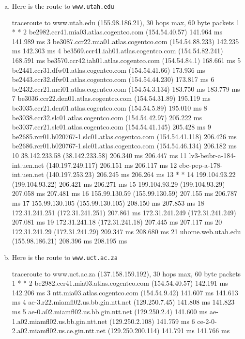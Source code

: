 \documentclass{article}
\begin{document}
\begin{enumerate}[a.]
\item Here is the route to {\tt www.utah.edu}
\begin{code}
traceroute to www.utah.edu (155.98.186.21), 30 hops max, 60 byte packets
 1  * *
 2  be2982.ccr41.mia03.atlas.cogentco.com (154.54.40.57)  141.964 ms  141.989 ms
 3  be3087.ccr22.mia01.atlas.cogentco.com (154.54.88.233)  142.235 ms  142.303 ms
 4  be3569.ccr41.iah01.atlas.cogentco.com (154.54.82.241)  168.591 ms be3570.ccr42.iah01.atlas.cogentco.com (154.54.84.1)  168.661 ms
 5  be2441.ccr31.dfw01.atlas.cogentco.com (154.54.41.66)  173.936 ms be2443.ccr32.dfw01.atlas.cogentco.com (154.54.44.230)  173.817 ms
 6  be2432.ccr21.mci01.atlas.cogentco.com (154.54.3.134)  183.750 ms  183.779 ms
 7  be3036.ccr22.den01.atlas.cogentco.com (154.54.31.89)  195.119 ms be3035.ccr21.den01.atlas.cogentco.com (154.54.5.89)  195.010 ms
 8  be3038.ccr32.slc01.atlas.cogentco.com (154.54.42.97)  205.222 ms be3037.ccr21.slc01.atlas.cogentco.com (154.54.41.145)  205.428 ms
 9  be2685.rcr01.b020767-1.slc01.atlas.cogentco.com (154.54.41.118)  206.426 ms be2686.rcr01.b020767-1.slc01.atlas.cogentco.com (154.54.46.134)  206.182 ms
10  38.142.233.58 (38.142.233.58)  206.340 ms  206.447 ms
11  lv3-beibr-a-184-int.uen.net (140.197.249.117)  206.151 ms  206.117 ms
12  ebc-pep-a-178-int.uen.net (140.197.253.23)  206.245 ms  206.264 ms
13  * *
14  199.104.93.22 (199.104.93.22)  206.421 ms  206.271 ms
15  199.104.93.29 (199.104.93.29)  207.058 ms  207.481 ms
16  155.99.130.59 (155.99.130.59)  207.155 ms  206.787 ms
17  155.99.130.105 (155.99.130.105)  208.150 ms  207.853 ms
18  172.31.241.251 (172.31.241.251)  207.861 ms 172.31.241.249 (172.31.241.249)  207.081 ms
19  172.31.241.18 (172.31.241.18)  207.445 ms  207.117 ms
20  172.31.241.29 (172.31.241.29)  209.347 ms  208.680 ms
21  uhome.web.utah.edu (155.98.186.21)  208.396 ms  208.195 ms
\end{code}
\item Here is the route to {\tt www.uct.ac.za}
\begin{code}
traceroute to www.uct.ac.za (137.158.159.192), 30 hops max, 60 byte packets
 1  * *
 2  be2982.ccr41.mia03.atlas.cogentco.com (154.54.40.57)  142.191 ms  142.206 ms
 3  ntt.mia03.atlas.cogentco.com (154.54.9.42)  141.607 ms  141.613 ms
 4  ae-3.r22.miamfl02.us.bb.gin.ntt.net (129.250.7.45)  141.808 ms  141.823 ms
 5  ae-0.a02.miamfl02.us.bb.gin.ntt.net (129.250.2.4)  141.600 ms ae-1.a02.miamfl02.us.bb.gin.ntt.net (129.250.2.108)  141.759 ms
 6  ce-2-0-2.a02.miamfl02.us.ce.gin.ntt.net (129.250.200.114)  141.791 ms  141.766 ms

\end{code}
\end{enumerate}
\end{document}
